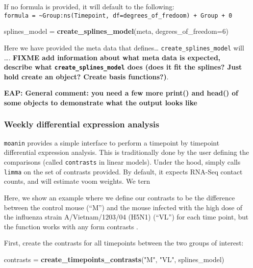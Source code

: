 \documentclass[9pt,a4paper,]{extarticle}
\newenvironment{Shaded}{\begin{snugshade}}{\end{snugshade}}
\newcommand{\DataTypeTok}[1]{\textcolor[rgb]{0.13,0.29,0.53}{#1}}
\newcommand{\DecValTok}[1]{\textcolor[rgb]{0.00,0.00,0.81}{#1}}
\newcommand{\KeywordTok}[1]{\textcolor[rgb]{0.13,0.29,0.53}{\textbf{#1}}}
\newcommand{\NormalTok}[1]{#1}
\newcommand{\StringTok}[1]{\textcolor[rgb]{0.31,0.60,0.02}{#1}}
\begin{document}
If no formula is provided, it will default to the following:
\texttt{formula\ =\ \textasciitilde{}Group:ns(Timepoint,\ df=degrees\_of\_fredoom)\ +\ Group\ +\ 0}

\begin{Shaded}
\begin{Highlighting}[]
\NormalTok{splines_model =}\StringTok{ }\KeywordTok{create_splines_model}\NormalTok{(meta, }\DataTypeTok{degrees_of_freedom=}\DecValTok{6}\NormalTok{)}
\end{Highlighting}
\end{Shaded}

Here we have provided the meta data that defines\ldots{} \texttt{create\_splines\_model}
will \ldots{}. \textbf{FIXME add information about what meta data is expected, describe
what \texttt{create\_splines\_model} does (does it fit the splines? Just hold create an
object? Create basis functions?)}.

\textbf{EAP: General comment: you need a few more print() and head() of some objects to demonstrate what the output looks like}

\hypertarget{weekly-differential-expression-analysis}{%
\subsubsection{Weekly differential expression analysis}\label{weekly-differential-expression-analysis}}

\texttt{moanin} provides a simple interface to perform a timepoint by timepoint
differential expression analysis. This is traditionally done by the user
defining the comparisons (called \texttt{contrasts} in linear models). Under the
hood, simply calls \texttt{limma} \citep{ritchie:limma} on the set of contrasts provided.
By default, it expects RNA-Seq contact counts, and will estimate voom weights.
We tern

Here, we show an example where we define our contrasts to be the difference
between the control mouse (``M'') and the mouse infected with the high dose of
the influenza strain A/Vietnam/1203/04 (H5N1) (``VL'') for each time point, but
the function works with any form contrasts \citep{ritchie:limma}.

First, create the contrasts for all timepoints between the two groups of
interest:

\begin{Shaded}
\begin{Highlighting}[]
\NormalTok{contrasts =}\StringTok{ }\KeywordTok{create_timepoints_contrasts}\NormalTok{(}\StringTok{"M"}\NormalTok{, }\StringTok{"VL"}\NormalTok{, splines_model)}
\end{Highlighting}
\end{Shaded}
\end{document}
